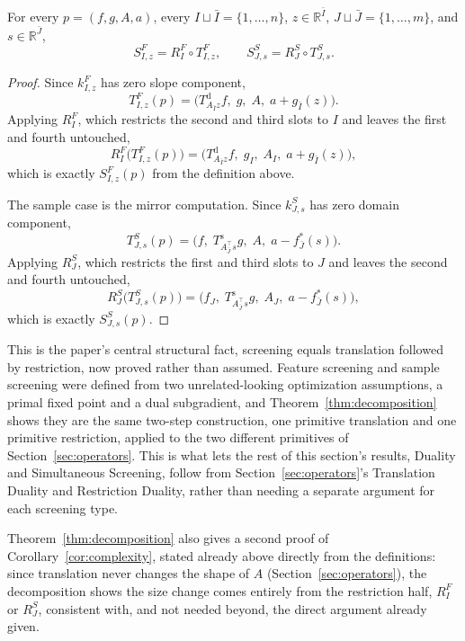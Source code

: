 \begin{theorem}
\label{thm:decomposition}
For every \(p=(f,g,A,a)\), every \(I\sqcup\bar I=\{1,\ldots,n\}\),
\(z\in\mathbb R^{\bar I}\), \(J\sqcup\bar J=\{1,\ldots,m\}\), and
\(s\in\mathbb R^{\bar J}\),
\[
S^{F}_{I,z}
=
R^{F}_{I}\circ T^{F}_{I,z},
\qquad
S^{S}_{J,s}
=
R^{S}_{J}\circ T^{S}_{J,s}.
\]
\end{theorem}

\begin{proof}
Since \(k^F_{I,z}\) has zero slope component,
\[
T^F_{I,z}(p)
=
\bigl(T^{\mathrm d}_{A_{\bar I}z}f,\;g,\;A,\;a+g_{\bar I}(z)\bigr).
\]
Applying \(R^F_I\), which restricts the second and third slots to
\(I\) and leaves the first and fourth untouched,
\[
R^F_I\bigl(T^F_{I,z}(p)\bigr)
=
\bigl(T^{\mathrm d}_{A_{\bar I}z}f,\;g_I,\;A_I,\;a+g_{\bar I}(z)\bigr),
\]
which is exactly \(S^F_{I,z}(p)\) from the definition above.

The sample case is the mirror computation. Since \(k^S_{J,s}\) has zero
domain component,
\[
T^S_{J,s}(p)
=
\bigl(f,\;T^{\mathrm s}_{A_{\bar J}^{\top}s}g,\;A,\;a-f_{\bar J}^{*}(s)\bigr).
\]
Applying \(R^S_J\), which restricts the first and third slots to \(J\)
and leaves the second and fourth untouched,
\[
R^S_J\bigl(T^S_{J,s}(p)\bigr)
=
\bigl(f_J,\;T^{\mathrm s}_{A_{\bar J}^{\top}s}g,\;A_J,\;a-f_{\bar J}^{*}(s)\bigr),
\]
which is exactly \(S^S_{J,s}(p)\).
\end{proof}
 

This is the paper's central structural fact, screening equals
translation followed by restriction, now proved rather than assumed.
Feature screening and sample screening were defined from two
unrelated-looking optimization assumptions, a primal fixed point and a
dual subgradient, and Theorem~\ref{thm:decomposition} shows they are
the same two-step construction, one primitive translation and one
primitive restriction, applied to the two different primitives of
Section~\ref{sec:operators}. This is what lets the rest of this
section's results, Duality and Simultaneous Screening, follow from
Section~\ref{sec:operators}'s Translation Duality and Restriction
Duality, rather than needing a separate argument for each screening
type.

Theorem~\ref{thm:decomposition} also gives a second proof of
Corollary~\ref{cor:complexity}, stated already above directly from the
definitions: since translation never changes the shape of \(A\)
(Section~\ref{sec:operators}), the decomposition shows the size change
comes entirely from the restriction half, \(R^F_I\) or \(R^S_J\),
consistent with, and not needed beyond, the direct argument already
given.

